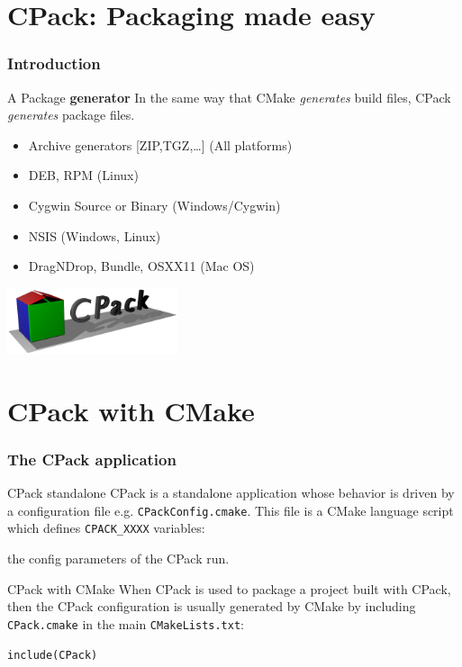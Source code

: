 \documentclass[compress,slidestop,table,usepdftitle=false
              ]
               {beamer}
\newcommand{\fname}[1]{\texttt{#1}}
\begin{document}
\section{CPack: Packaging made easy}
\begin{frame}
\frametitle{Introduction}
\begin{block}{A Package \textbf{generator}}
In the same way that CMake \emph{generates} build files, CPack
\emph{generates} package files.
\end{block}

\begin{multicols}{2}
\begin{itemize}
\item Archive generators [ZIP,TGZ,\ldots] (All platforms)
\item DEB, RPM (Linux)
\item Cygwin Source or Binary (Windows/Cygwin)
\item NSIS (Windows, Linux)
\item DragNDrop, Bundle, OSXX11 (Mac OS)
\end{itemize}
\columnbreak
\includegraphics[width=5cm]{figures/CPack-logo-3D-opened-v2} \\
\end{multicols}
\end{frame}

\section{CPack with CMake}


\begin{frame}
\frametitle{The CPack application}
\begin{block}{CPack standalone}
CPack is a standalone application whose behavior is
driven by a configuration file e.g. \fname{CPackConfig.cmake}.
This file is a CMake language script which defines
\lstinline!CPACK_XXXX! variables:

the config parameters of the CPack run.
\end{block}
\begin{block}{CPack with CMake}
When CPack is used to package a project built with CPack,
then the CPack configuration is usually generated by CMake by
including \fname{CPack.cmake} in the main \fname{CMakeLists.txt}:

\lstinline!include(CPack)!
\end{block}
\end{frame}
\end{document}
